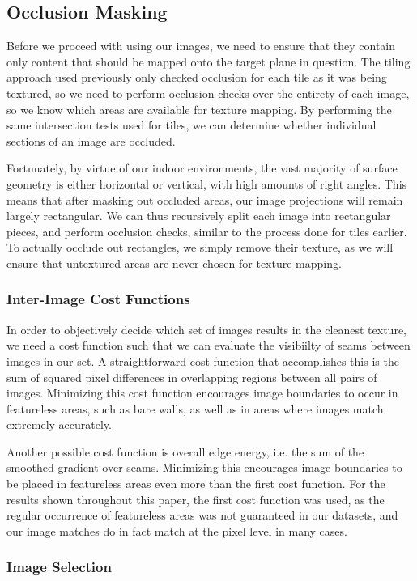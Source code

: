 \documentclass[10pt,twocolumn,letterpaper]{article}
\begin{document}
\subsection{Occlusion Masking}
Before we proceed with using our images, we need to ensure that they
contain only content that should be mapped onto the target plane in
question. The tiling approach used previously only checked occlusion
for each tile as it was being textured, so we need to perform
occlusion checks over the entirety of each image, so we know which
areas are available for texture mapping. By performing the same
intersection tests used for tiles, we can determine whether individual
sections of an image are occluded.

Fortunately, by virtue of our indoor environments, the vast majority
of surface geometry is either horizontal or vertical, with high
amounts of right angles. This means that after masking out occluded
areas, our image projections will remain largely rectangular. We can
thus recursively split each image into rectangular pieces, and perform
occlusion checks, similar to the process done for tiles earlier. To
actually occlude out rectangles, we simply remove their texture, as we
will ensure that untextured areas are never chosen for texture
mapping.

\subsubsection{Inter-Image Cost Functions}
In order to objectively decide which set of images results in the
cleanest texture, we need a cost function such that we can evaluate
the visibiilty of seams between images in our set. A straightforward
cost function that accomplishes this is the sum of squared pixel
differences in overlapping regions between all pairs of
images. Minimizing this cost function encourages image boundaries to
occur in featureless areas, such as bare walls, as well as in areas
where images match extremely accurately.

Another possible cost function is overall edge energy, i.e. the sum of
the smoothed gradient over seams. Minimizing this encourages image
boundaries to be placed in featureless areas even more than the first
cost function. For the results shown throughout this paper, the first
cost function was used, as the regular occurrence of featureless areas
was not guaranteed in our datasets, and our image matches do in fact
match at the pixel level in many cases.

\subsubsection{Image Selection}
\end{document}
